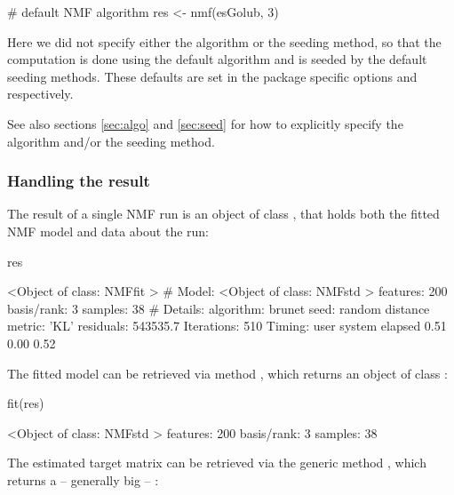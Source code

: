 \documentclass[a4paper]{article}
\begin{document}
\begin{Schunk}
\begin{Sinput}
 # default NMF algorithm
 res <- nmf(esGolub, 3)
\end{Sinput}
\end{Schunk}

Here we did not specify either the algorithm or the seeding method, so that the 
computation is done using the default algorithm and is seeded by the 
default seeding methods.
These defaults are set in the package specific options  
and  respectively.

See also sections \ref{sec:algo} and \ref{sec:seed} for how to explicitly specify 
the algorithm and/or the seeding method.

\subsubsection{Handling the result}

The result of a single NMF run is an object of class , that holds 
both the fitted NMF model and data about the run:

\begin{Schunk}
\begin{Sinput}
 res 
\end{Sinput}
\begin{Soutput}
<Object of class: NMFfit >
 # Model:
  <Object of class: NMFstd >
  features: 200 
  basis/rank: 3 
  samples: 38 
 # Details:
  algorithm:  brunet 
  seed:  random 
  distance metric:  'KL' 
  residuals:  543535.7 
  Iterations: 510 
  Timing:
     user  system elapsed 
     0.51    0.00    0.52 
\end{Soutput}
\end{Schunk}

The fitted model can be retrieved via method , which returns an object of 
class :

\begin{Schunk}
\begin{Sinput}
 fit(res)
\end{Sinput}
\begin{Soutput}
<Object of class: NMFstd >
features: 200 
basis/rank: 3 
samples: 38 
\end{Soutput}
\end{Schunk}

The estimated target matrix can be retrieved via the generic method , 
which returns a -- generally big -- :
\end{document}
